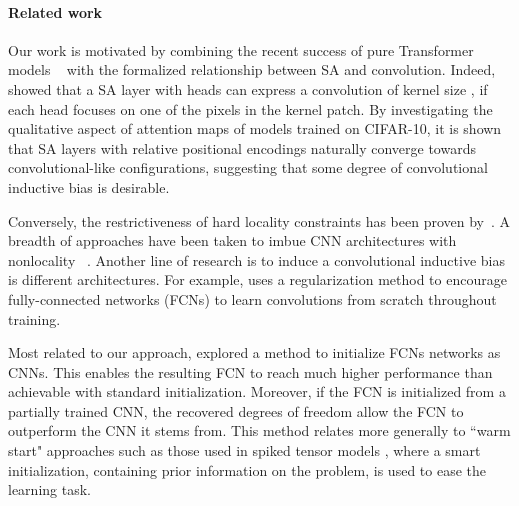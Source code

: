  

\paragraph{Related work}

Our work is motivated by combining the recent success of pure Transformer models ~\cite{dosovitskiy2020image} with the formalized relationship between SA and convolution. Indeed, \citet{cordonnier2019relationship} showed that a SA layer with  heads can express a convolution of kernel size , if each head focuses on one of the pixels in the kernel patch. By investigating the qualitative aspect of attention maps of models trained on CIFAR-10, it is shown that SA layers with relative positional encodings naturally converge towards convolutional-like configurations, suggesting that some degree of convolutional inductive bias is desirable.

Conversely, the restrictiveness of hard locality constraints has been proven by~\citet{elsayed2020revisiting}. A breadth of approaches have been taken to imbue CNN architectures with nonlocality ~\cite{hu_gather-excite_2018,hu_squeeze-and-excitation_2018,wang_non-local_2018,wu_visual_2020}. Another line of research is to induce a convolutional inductive bias is different architectures. For example, \citet{neyshabur2020towards} uses a regularization method to encourage fully-connected networks (FCNs) to learn convolutions from scratch throughout training. 

Most related to our approach, \citet{d2019finding} explored a method to initialize FCNs networks as CNNs. This enables the resulting FCN to reach much higher performance than achievable with standard initialization. Moreover, if the FCN is initialized from a partially trained CNN, the recovered degrees of freedom allow the FCN to outperform the CNN it stems from. This method relates more generally to ``warm start" approaches such as those used in spiked tensor models \cite{anandkumar2016homotopy}, where a smart initialization, containing prior information on the problem, is used to ease the learning task.

